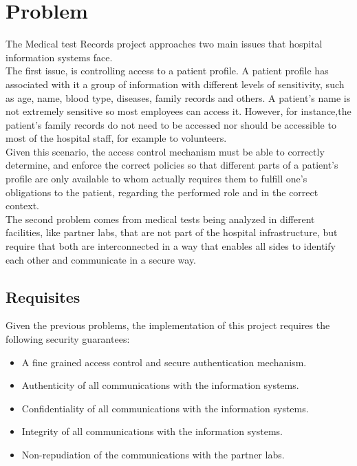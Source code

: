 \section{Problem}

The Medical test Records project approaches two main issues that hospital information systems face. \\

The first issue, is controlling access to a patient profile.
A patient profile has associated with it a group of information with different levels of sensitivity, such as age, name, blood type, diseases, family records and others.
A patient's name is not extremely sensitive so most employees can access it. However, for instance,the patient's family records do not need to be accessed nor should be accessible to most of the hospital staff, for example to volunteers. \\

Given this scenario, the access control mechanism must be able to correctly determine, and enforce the correct policies so that different parts of a patient's profile are only available to whom actually requires them to fulfill one's obligations to the patient, regarding the performed role and in the correct context. \\

The second problem comes from medical tests being analyzed in different facilities, like partner labs, that are not part of the hospital infrastructure, but require that both are interconnected in a way that enables all sides to identify each other and communicate in a secure way. \\

\subsection{Requisites}

Given the previous problems, the implementation of this project requires the following security guarantees:
\begin{itemize}
	\item A fine grained access control and secure authentication mechanism.
	\item Authenticity of all communications with the information systems.
	\item Confidentiality of all communications with the information systems.
	\item Integrity of all communications with the information systems.
	\item Non-repudiation of the communications with the partner labs.
\end{itemize}

